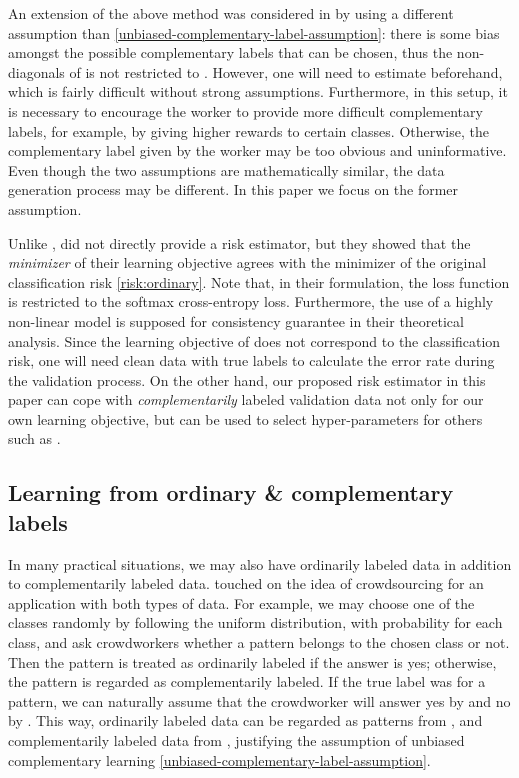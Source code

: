 \documentclass{article}
\begin{document}
An extension of the above method was considered in \citet{yu17eccv} by using a different assumption than \eqref{unbiased-complementary-label-assumption}:
there is some bias amongst the possible complementary labels that can be chosen, thus the non-diagonals of  is not restricted to .
However, one will need to estimate  beforehand, which is fairly difficult without strong assumptions.
Furthermore, in this setup, it is necessary to encourage the worker to provide more difficult complementary labels, for example, by giving higher rewards to certain classes.  Otherwise, the complementary label given by the worker may be too obvious and uninformative.  Even though the two assumptions are mathematically similar, the data generation process may be different.  In this paper we focus on the former assumption.

Unlike \citet{ishida17nips}, \citet{yu17eccv} did not directly provide a risk estimator, but they showed that the \emph{minimizer} of their learning objective agrees with the minimizer of the original classification risk \eqref{risk:ordinary}.
Note that, in their formulation, the loss function is restricted to the softmax cross-entropy loss. Furthermore, the use of a highly non-linear model is supposed for consistency guarantee in their theoretical analysis.
Since the learning objective of \citet{yu17eccv} does not correspond to the classification risk, one will need clean data with true labels to calculate the error rate during the validation process.
On the other hand, our proposed risk estimator in this paper can cope with \emph{complementarily} labeled validation data not only for our own learning objective, but can be used to select hyper-parameters for others such as \citet{yu17eccv}.

\subsection{Learning from ordinary \& complementary labels}
In many practical situations, we may also have ordinarily labeled data in addition to complementarily labeled data.  \citet{ishida17nips} touched on the idea of crowdsourcing for an application with both types of data.
For example, we may choose one of the classes randomly by following the uniform distribution, with probability  for each class, and ask crowdworkers whether a pattern belongs to the chosen class or not.
Then the pattern is treated as ordinarily labeled if the answer is yes; otherwise, the pattern is regarded as complementarily labeled.
If the true label was  for a pattern, we can naturally assume that the crowdworker will answer yes by 
 and no by .
This way, ordinarily labeled data can be regarded as patterns from , and complementarily labeled data from , justifying the assumption of unbiased complementary learning \eqref{unbiased-complementary-label-assumption}.
\end{document}

